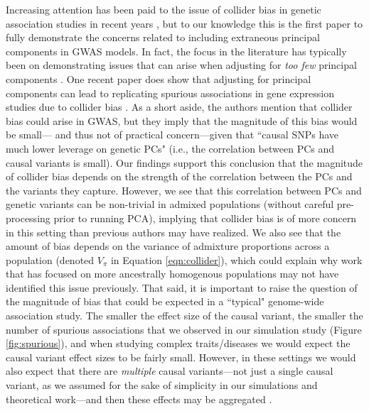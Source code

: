 \documentclass[12pt]{article}
\begin{document}
Increasing attention has been paid to the issue of collider bias in genetic association studies in recent years \citep{aschard2015, day2016, cai2022, hemani2022}, but to our knowledge this is the first paper to fully demonstrate the concerns related to including extraneous principal components in GWAS models.
In fact, the focus in the literature has typically been on demonstrating issues that can arise when adjusting for \textit{too few} principal components \citep{eigenstrat, kang2010, Yao2022}. %
One recent paper does show that adjusting for principal components can lead to replicating spurious associations in gene expression studies due to collider bias \citep{dahl2019}.
As a short aside, the authors mention that collider bias could arise in GWAS, but they imply that the magnitude of this bias would be small--- and thus not of practical concern---given that ``causal SNPs have much lower leverage on genetic PCs" (i.e., the correlation between PCs and causal variants is small).  
Our findings support this conclusion that the magnitude of collider bias depends on the strength of the correlation between the PCs and the variants they capture.
However, we see that this correlation between PCs and genetic variants can be non-trivial in admixed populations (without careful pre-processing prior to running PCA), implying that collider bias is of more concern in this setting than previous authors may have realized.
We also see that the amount of bias depends on the variance of admixture proportions across a population (denoted $V_\pi$ in Equation \ref{eqn:collider}), which could explain why work that has focused on more ancestrally homogenous populations may not have identified this issue previously.
That said, it is important to raise the question of the magnitude of bias that could be expected in a ``typical" genome-wide association study. 
The smaller the effect size of the causal variant, the smaller the number of spurious associations that we observed in our simulation study (Figure \ref{fig:spurious}), and when studying complex traits/diseases we would expect the causal variant effect sizes to be fairly small.
However, in these settings we would also expect that there are \textit{multiple} causal variants---not just a single causal variant, as we assumed for the sake of simplicity in our simulations and theoretical work---and then these effects may be aggregated \citep{di2011}. 
\end{document}
